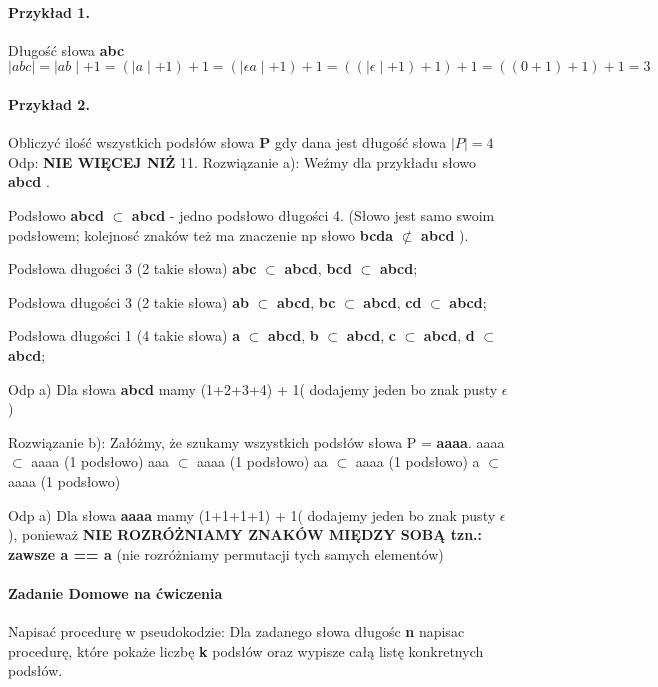 \paragraph{Przykład 1.}
Długość słowa {\bf abc} \newline
$\mid abc \mid = \mid ab \mid + 1 = ( \mid a \mid + 1) + 1 = 
(\mid \epsilon a \mid + 1) + 1 =   ((\mid \epsilon \mid + 1 )+1)+1 =
((0+1)+1)+1 = 3
$ 

\paragraph{Przykład 2.}
Obliczyć ilość wszystkich podsłów słowa {\bf P} gdy dana jest długość słowa $\mid P \mid = 4$ \newline
Odp: { \bf NIE WIĘCEJ NIŻ} 11. \newline
Rozwiązanie a):\newline
Weźmy dla przykładu słowo {\bf abcd }. 

Podsłowo {\bf abcd} $\subset$ {\bf abcd} - jedno podsłowo długości 4. (Słowo jest samo swoim podsłowem; kolejnosć znaków też ma znaczenie np słowo {\bf bcda} $\not\subset $ {\bf abcd}  ).
\newline

Podsłowa długości 3 (2 takie słowa)
{\bf abc} $\subset$ {\bf abcd},
{\bf bcd} $\subset$ {\bf abcd};

Podsłowa długości 3 (2 takie słowa)
{\bf ab} $\subset$ {\bf abcd},
{\bf bc} $\subset$ {\bf abcd},
{\bf cd} $\subset$ {\bf abcd};

Podsłowa długości 1 (4 takie słowa)
{\bf a} $\subset$ {\bf abcd},
{\bf b} $\subset$ {\bf abcd},
{\bf c} $\subset$ {\bf abcd},
{\bf d} $\subset$ {\bf abcd};

Odp a) Dla słowa { \bf abcd} mamy (1+2+3+4) + 1( dodajemy jeden bo znak pusty $\epsilon$ )

Rozwiązanie b):
Załóżmy, że szukamy wszystkich podsłów słowa P = {\bf aaaa}. 
aaaa $\subset$  aaaa (1 podsłowo)
aaa $\subset$  aaaa (1 podsłowo)
aa $\subset$  aaaa (1 podsłowo)
a $\subset$  aaaa (1 podsłowo)

Odp a) Dla słowa { \bf aaaa} mamy (1+1+1+1) + 1( dodajemy jeden bo znak pusty $\epsilon$ ), ponieważ {\bf NIE ROZRÓŻNIAMY ZNAKÓW MIĘDZY SOBĄ tzn.: zawsze a == a} (nie rozróżniamy permutacji tych samych elementów)


\paragraph{Zadanie Domowe na ćwiczenia}
Napisać procedurę w pseudokodzie:
Dla zadanego słowa długośc {\bf n} napisac procedurę, które pokaże liczbę {\bf k} podsłów oraz wypisze całą listę konkretnych podsłów.

